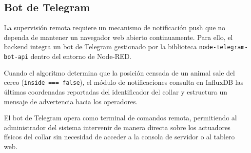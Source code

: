 \subsection{Bot de Telegram}

La supervisión remota requiere un mecanismo de notificación push que no dependa de mantener un navegador web abierto continuamente. Para ello, el backend integra un bot de Telegram gestionado por la biblioteca \texttt{node-telegram-bot-api} dentro del entorno de Node-RED.

Cuando el algoritmo determina que la posición censada de un animal sale del cerco (\texttt{inside === false}), el módulo de notificaciones consulta en InfluxDB las últimas coordenadas reportadas del identificador del collar y estructura un mensaje de advertencia hacia los operadores.

El bot de Telegram opera como terminal de comandos remota, permitiendo al administrador del sistema intervenir de manera directa sobre los actuadores físicos del collar sin necesidad de acceder a la consola de servidor o al tablero web.

